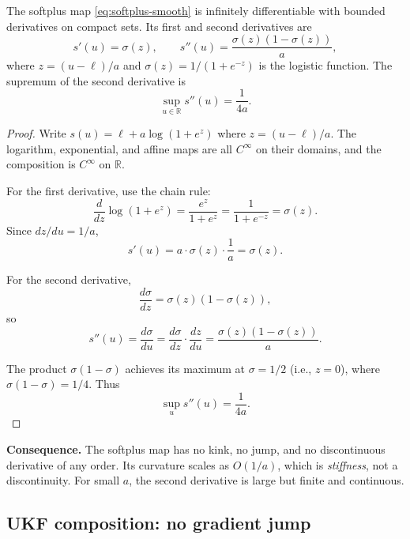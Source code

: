 \begin{proposition}
\label{prop:softplus-smooth}
The softplus map \eqref{eq:softplus-smooth} is infinitely differentiable with bounded derivatives on compact sets. Its first and second derivatives are
\begin{equation}\label{eq:softplus-derivatives}
s'(u) = \sigma(z), \qquad s''(u) = \frac{\sigma(z)(1 - \sigma(z))}{a},
\end{equation}
where $z = (u - \ell)/a$ and $\sigma(z) = 1/(1 + e^{-z})$ is the logistic function. The supremum of the second derivative is
\begin{equation}\label{eq:softplus-curvature-bound}
\sup_{u \in \mathbb{R}} s''(u) = \frac{1}{4a}.
\end{equation}
\end{proposition}

\begin{proof}
Write $s(u) = \ell + a \log(1 + e^z)$ where $z = (u - \ell)/a$. The logarithm, exponential, and affine maps are all $C^\infty$ on their domains, and the composition is $C^\infty$ on $\mathbb{R}$.

For the first derivative, use the chain rule:
\[
\frac{d}{dz} \log(1 + e^z) = \frac{e^z}{1 + e^z} = \frac{1}{1 + e^{-z}} = \sigma(z).
\]
Since $dz/du = 1/a$,
\[
s'(u) = a \cdot \sigma(z) \cdot \frac{1}{a} = \sigma(z).
\]

For the second derivative,
\[
\frac{d\sigma}{dz} = \sigma(z)(1 - \sigma(z)),
\]
so
\[
s''(u) = \frac{d\sigma}{du} = \frac{d\sigma}{dz} \cdot \frac{dz}{du} = \frac{\sigma(z)(1 - \sigma(z))}{a}.
\]

The product $\sigma(1 - \sigma)$ achieves its maximum at $\sigma = 1/2$ (i.e., $z = 0$), where $\sigma(1 - \sigma) = 1/4$. Thus
\[
\sup_u s''(u) = \frac{1}{4a}.
\]
\end{proof}

\textbf{Consequence.} The softplus map has no kink, no jump, and no discontinuous derivative of any order. Its curvature scales as $O(1/a)$, which is \emph{stiffness}, not a discontinuity. For small $a$, the second derivative is large but finite and continuous.

\subsection{UKF composition: no gradient jump}

